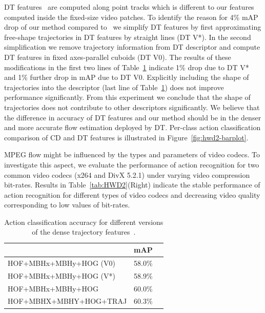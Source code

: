 \documentclass[10pt,twocolumn,letterpaper]{article}
\begin{document}
DT features~\cite{Wang12} are computed along point tracks which is different to our features computed inside the fixed-size video patches. To identify the reason for 4\% mAP drop of our method compared to~\cite{Wang12} we simplify DT features by first approximating free-shape trajectories in DT features by straight lines (DT V*). In the second simplification we remove trajectory information from DT descriptor and compute DT features in fixed axes-parallel cuboids (DT V0). The results of these modifications in the first two lines of Table~\ref{tab:HWD2traj} indicate 1\% drop due to DT V* and 1\% further drop in mAP due to DT V0. Explicitly including the shape of trajectories into the descriptor (last line of Table~\ref{tab:HWD2traj}) does not improve performance significantly. From this experiment we conclude that the shape of trajectories does not contribute to other descriptors significantly. We believe that the difference in accuracy of DT features and our method should be in the denser and more accurate flow estimation deployed by DT. Per-class action classification comparison of CD and DT features is illustrated in Figure~\ref{fig:hwd2-barplot}.

MPEG flow might be influenced by the types and parameters of video codecs. To investigate this aspect, we evaluate the performance of action recognition for two common video codecs (x264 and DivX 5.2.1) under varying video compression bit-rates. Results in Table~\ref{tab:HWD2}(Right) indicate the stable performance of action recognition for different types of video codecs and decreasing video quality corresponding to low values of bit-rates.

\begin{table}
\begin{center}
\begin{tabular}{|l|c|c|}
\hline
& mAP \\\hline
HOF+MBHx+MBHy+HOG (V0)  					& 58.0\%	\\\hline
HOF+MBHx+MBHy+HOG (V*)						& 58.9\%	\\\hline
HOF+MBHx+MBHy+HOG \cite{Wang12}     	& 60.0\% 	\\\hline
HOF+MBHX+MBHY+HOG+TRAJ \cite{Wang12} 	& 60.3\% 	\\\hline
\end{tabular}
\mbox{}\vspace{.2cm}\\
\caption{Action classification accuracy for different versions of the dense trajectory features~\cite{Wang12}.\vspace{-.7cm}}
\label{tab:HWD2traj}
\end{center}
\end{table}
\end{document}
